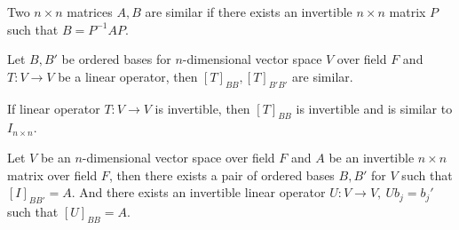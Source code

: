 	\begin{definition}
		Two $n \times n$ matrices $A,B$ are similar if there exists an invertible $n \times n$ matrix $P$ such that $B = P^{-1}AP$.
	\end{definition}
	\begin{remark}
		Let $B,B'$ be ordered bases for $n$-dimensional vector space $V$ over field $F$ and $T : V \to V$ be a linear operator, then $[T]_{BB},[T]_{B'B'}$ are similar.
	\end{remark}
	\begin{remark}
		If linear operator $T : V \to V$ is invertible, then $[T]_{BB}$ is invertible and is similar to $I_{n \times n}$.
	\end{remark}
	\begin{remark}
		Let $V$ be an $n$-dimensional vector space over field $F$ and $A$ be an invertible $n \times n$ matrix over field $F$, then there exists a pair of ordered bases $B,B'$ for $V$ such that $[I]_{BB'} = A$. And there exists an invertible linear operator $U : V \to V,\ Ub_j = b_j'$ such that $[U]_{BB} = A$.
	\end{remark}
